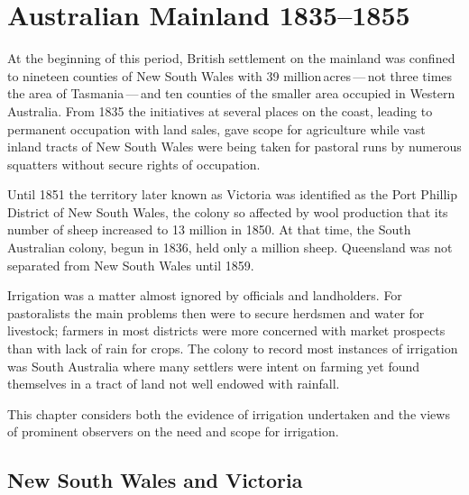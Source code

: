 
\setcounter{endnote}{0}

\chapter{Australian Mainland 1835--1855}
\label{ch:mainland} 


At the beginning of this period, British settlement on the mainland
was confined to nineteen counties of New South Wales with 39
million\,acres\,---\,not three times the area of Tasmania\,---\,and
ten counties of the smaller area occupied in Western Australia.  From
1835 the initiatives at several places on the coast, leading to
permanent occupation with land sales, gave scope for agriculture while
vast inland tracts of New South Wales were being taken for pastoral
runs by numerous squatters without secure rights of occupation.

Until 1851 the territory later known as Victoria was identified as the
Port Phillip District of New South Wales, the colony so affected by
wool production that its number of sheep increased to 13 million in
1850.  At that time, the South Australian colony, begun in 1836, held
only a million sheep.  Queensland was not separated from New South
Wales until 1859.

Irrigation was a matter almost ignored by officials and landholders.
For pastoralists the main problems then were to secure herdsmen and
water for livestock; farmers in most districts were more concerned
with market prospects than with lack of rain for crops.  The colony to
record most instances of irrigation was South Australia where many
settlers were intent on farming yet found themselves in a tract of
land not well endowed with rainfall.

This chapter considers both the evidence of irrigation undertaken and
the views of prominent observers on the need and scope for irrigation.

\section*{New South Wales and Victoria}
 

